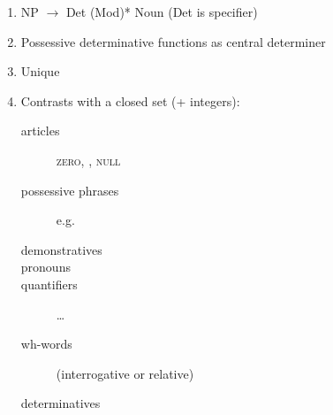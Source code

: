 \documentclass[a4paper,landscape,headrule,footrule,dvips]{foils}
\begin{document}
\begin{CJK}{UTF8}{min}
\begin{enumerate}\addtolength{\itemsep}{-5mm}
\item NP $\rightarrow$ Det (Mod)* Noun \hfill (Det is specifier)
\item Possessive determinative functions as central determiner
\item Unique
\item Contrasts with a closed set (+ integers):
  \begin{description}
  \item[articles] \textsc{zero}, , \textsc{null}

  \item[possessive phrases] e.g. 
  \item[demonstratives] 
  \item[pronouns] 
  \item[quantifiers]  \ldots
  \item[wh-words]  (interrogative or relative)
  \item[determinatives] 
  \end{description}
\end{enumerate}



\end{CJK}
\end{document}
